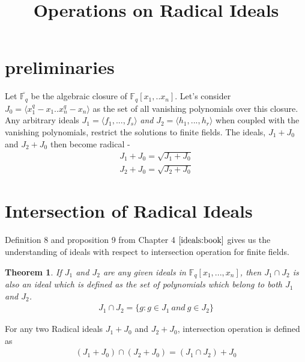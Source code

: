 \documentclass{article}
\title{Operations on Radical Ideals}
\newtheorem{Theorem}{Theorem}[section]
\newcommand{\Fq}{{\mathbb{F}}_{q}}
\newcommand{\Jo}{J_1}
\newcommand{\Jz}{J_0}
\newcommand{\Jt}{J_2}
\newcommand{\Joz}{J_1 + J_0}
\newcommand{\Jtz}{J_2 + J_0}
\newcommand{\Fqbar}{{\overline{{\mathbb{F}}_q}}}
\begin{document}
\maketitle
\section{preliminaries}
Let $\Fqbar$ be the algebraic closure of $\Fq[x_1,..x_n]$. Let's consider $J_0 = \langle x_1^q-x_1..x_n^q-x_n \rangle$ as the set of all vanishing polynomials over this closure. Any arbitrary ideals $\Jo = \langle f_1,...,f_s\rangle$ \textit{and} $\Jt = \langle h_1,...,h_r \rangle$ when coupled with the vanishing polynomials, restrict the solutions to finite fields. The ideals, $\Joz$ and $\Jtz$ then become radical -
\begin{align*}
 \Joz = \sqrt{\Joz}\\
 \Jtz = \sqrt{\Jtz}
\end{align*}

\section{Intersection of Radical Ideals}
Definition 8 and proposition 9 from Chapter 4 $\cite{ideals:book}$ gives us the understanding of ideals with respect to intersection operation for finite fields.\\ 

\begin{Theorem}
\textit{If} $\Jo$ \textit{and} $\Jt$ \textit{are any given ideals in} $\Fq[x_1,...,x_n]$, \textit{ then} $\Jo \cap \Jt$ \textit{is also an ideal which is defined as the set of polynomials which belong to both} $\Jo$ \textit{and} $\Jt$.
\begin{align}
 \Jo \cap \Jt = \{ g : g \in \Jo\ and\ g \in \Jt\}  
\end{align}
\end{Theorem}

For any two Radical ideals $\Joz$ and $\Jtz$, intersection operation is defined as
\begin{align}
 (\Joz) \cap (\Jtz) = (\Jo \cap \Jt) + \Jz
\end{align}
\end{document}
